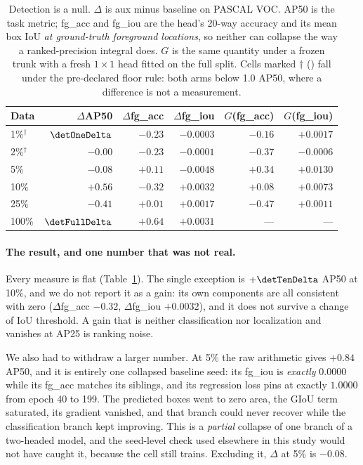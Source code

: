 \begin{table}[pos=htbp]
\caption{Detection is a null. $\Delta$ is aux minus baseline on PASCAL VOC.
AP50 is the task metric; fg\_acc and fg\_iou are the head's 20-way accuracy and
its mean box IoU \emph{at ground-truth foreground locations}, so neither can
collapse the way a ranked-precision integral does. $G$ is the same quantity
under a frozen trunk with a fresh $1\times1$ head fitted on the full split.
Cells marked $\dagger$ (\detFloorPcts) fall under the pre-declared floor rule:
both arms below 1.0 AP50, where a difference is not a measurement.}
\label{tab:det}
\centering\scriptsize
\setlength{\tabcolsep}{3.6pt}
\begin{tabular}{lrrrrr}
\toprule
Data & $\Delta$AP50 & $\Delta$fg\_acc & $\Delta$fg\_iou & $G$(fg\_acc) & $G$(fg\_iou) \\
\midrule
1\%$^\dagger$  & $\detOneDelta$ & $-0.23$ & $-0.0003$ & $-0.16$ & $+0.0017$ \\
2\%$^\dagger$  & $-0.00$ & $-0.23$ & $-0.0001$ & $-0.37$ & $-0.0006$ \\
5\%            & $-0.08$ & $+0.11$ & $-0.0048$ & $+0.34$ & $+0.0130$ \\
10\%           & $+0.56$ & $-0.32$ & $+0.0032$ & $+0.08$ & $+0.0073$ \\
25\%           & $-0.41$ & $+0.01$ & $+0.0017$ & $-0.47$ & $+0.0011$ \\
100\%          & $\detFullDelta$ & $+0.64$ & $+0.0031$ & ---     & ---       \\
\bottomrule
\end{tabular}
\end{table}

\paragraph{The result, and one number that was not real.} Every measure is flat
(Table~\ref{tab:det}). The single exception is $+\detTenDelta$ AP50 at 10\%, and
we do not report it as a gain: its own components are all consistent with zero
($\Delta$fg\_acc $-0.32$, $\Delta$fg\_iou $+0.0032$), and it does not survive a
change of IoU threshold. A gain that is neither classification nor localization
and vanishes at AP25 is ranking noise.

We also had to withdraw a larger number. At 5\% the raw arithmetic gives
$+0.84$ AP50, and it is entirely one collapsed baseline seed: its fg\_iou is
\emph{exactly} $0.0000$ while its fg\_acc matches its siblings, and its
regression loss pins at exactly $1.0000$ from epoch 40 to 199. The predicted
boxes went to zero area, the GIoU term saturated, its gradient vanished, and
that branch could never recover while the classification branch kept improving.
This is a \emph{partial} collapse of one branch of a two-headed model, and the
seed-level check used elsewhere in this study would not have caught it, because
the cell still trains. Excluding it, $\Delta$ at 5\% is $-0.08$.

